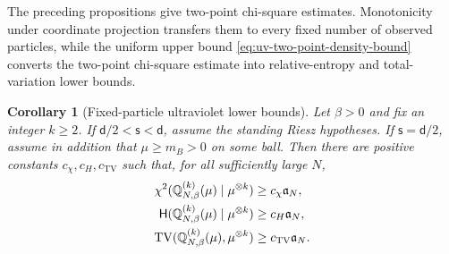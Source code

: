 \documentclass[11pt,reqno]{amsart}
\numberwithin{equation}{section}
\theoremstyle{plain}
\newtheorem{cor}[cor]{Corollary}
\theoremstyle{remark}
\DeclarePairedDelimiter{\pa}{\lparen}{\rparen}
\renewcommand{\d}{\mathsf{d}}
\newcommand{\Q}{{\mathbb{Q}}}
\newcommand{\Hr}{{\mathsf{H}}}
\newcommand{\be}{\beta}
\newcommand{\s}{\mathsf{s}}
\newcommand{\Chi}{\chi^2}
\newcommand{\TV}{\operatorname{TV}}
\begin{document}
The preceding propositions give two-point chi-square estimates.  Monotonicity under coordinate projection transfers them to every fixed number of observed particles, while the uniform upper bound \eqref{eq:uv-two-point-density-bound} converts the two-point chi-square estimate into relative-entropy and total-variation lower bounds.

\begin{cor}[Fixed-particle ultraviolet lower bounds]
\label{cor:uv-fixed-particle-all-divergences}
Let \(\be>0\) and fix an integer \(k\ge2\).  If \(\d/2<\s<\d\), assume the standing Riesz hypotheses.  If \(\s=\d/2\), assume in addition that \(\mu\ge m_B>0\) on some ball.  Then there are positive constants \(c_\chi,c_H,c_{\mathrm{TV}}\) such that, for all sufficiently large \(N\),
\begin{align}
 \Chi\pa{\Q_{N,\be}^{(k)}(\mu)\mid\mu^{\otimes k}}
 &\ge c_\chi\mathfrak a_N,
 \label{eq:uv-fixed-particle-chi}\\
 \Hr\pa{\Q_{N,\be}^{(k)}(\mu)\mid\mu^{\otimes k}}
 &\ge c_H\mathfrak a_N,
 \label{eq:uv-fixed-particle-H}\\
 \TV\pa{\Q_{N,\be}^{(k)}(\mu),\mu^{\otimes k}}
 &\ge c_{\mathrm{TV}}\mathfrak a_N.
 \label{eq:uv-fixed-particle-TV}
\end{align}
\end{cor}
\end{document}
